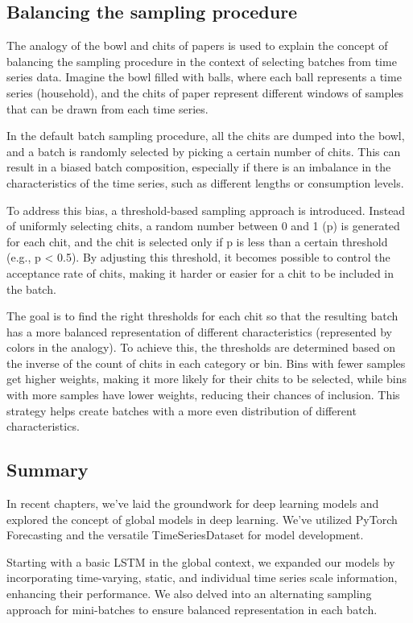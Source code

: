 \documentclass{article}
\begin{document}
\subsection{Balancing the sampling procedure}
The analogy of the bowl and chits of papers is used to explain the concept of balancing the sampling procedure in the context of selecting batches from time series data. Imagine the bowl filled with balls, where each ball represents a time series (household), and the chits of paper represent different windows of samples that can be drawn from each time series.

In the default batch sampling procedure, all the chits are dumped into the bowl, and a batch is randomly selected by picking a certain number of chits. This can result in a biased batch composition, especially if there is an imbalance in the characteristics of the time series, such as different lengths or consumption levels.

To address this bias, a threshold-based sampling approach is introduced. Instead of uniformly selecting chits, a random number between 0 and 1 (p) is generated for each chit, and the chit is selected only if p is less than a certain threshold (e.g., p < 0.5). By adjusting this threshold, it becomes possible to control the acceptance rate of chits, making it harder or easier for a chit to be included in the batch.

The goal is to find the right thresholds for each chit so that the resulting batch has a more balanced representation of different characteristics (represented by colors in the analogy). To achieve this, the thresholds are determined based on the inverse of the count of chits in each category or bin. Bins with fewer samples get higher weights, making it more likely for their chits to be selected, while bins with more samples have lower weights, reducing their chances of inclusion. This strategy helps create batches with a more even distribution of different characteristics.

\subsection{Summary}
In recent chapters, we've laid the groundwork for deep learning models and explored the concept of global models in deep learning. We've utilized PyTorch Forecasting and the versatile TimeSeriesDataset for model development.

Starting with a basic LSTM in the global context, we expanded our models by incorporating time-varying, static, and individual time series scale information, enhancing their performance. We also delved into an alternating sampling approach for mini-batches to ensure balanced representation in each batch.
\end{document}
